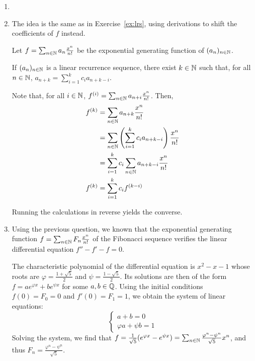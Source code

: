 \begin{solution}
    \begin{enumerate}
        \item[]
        \item The idea is the same as in Exercise~\ref{ex:lrs}, using
            derivations to shift the coefficients of $f$ instead.

            Let $f = \sum_{n \in \mathbb N} a_n \frac{x^n}{n!}$ be the
            exponential generating function of $(a_n)_{n \in \mathbb N}$.

            If $(a_n)_{n \in \mathbb N}$ is a linear recurrence sequence,
            there exist $k \in \mathbb N$ such that, for all $n \in \mathbb N$,
            $a_{n+k} = \sum_{i=1}^k c_i a_{n+k-i}$.

            Note that, for all $i \in \mathbb N$, $f^{(i)} = \sum_{n \in \mathbb N}
            a_{n+i} \frac{x^n}{n!}$.
            Then,
            \begin{align*}
                f^{(k)} &= \sum_{n \in \mathbb N} a_{n+k} \frac{x^n}{n!} \\
                &= \sum_{n \in \mathbb N} \left(\sum_{i=1}^k c_i
                a_{n+k-i}\right) \frac{x^n}{n!} \\
                &= \sum_{i=1}^k c_i \sum_{n \in \mathbb N} a_{n+k-i} \frac{x^n}{n!} \\
                f^{(k)} &= \sum_{i=1}^k c_i f^{(k-i)}
            \end{align*}

            Running the calculations in reverse yields the converse.
        \item Using the previous question, we known that the
            exponential generating function $f = \sum_{n \in \mathbb N} F_n
            \frac{x^n}{n!}$ of the Fibonacci sequence verifies the
            linear differential equation $f''- f'-f = 0$.

            The characteristic polynomial of the differential
            equation is $x^2-x-1$ whose roots are $\varphi =
            \frac{1+\sqrt{5}}{2}$ and $\psi = \frac{1-\sqrt{5}}{2}$.
            Its solutions are then of the form $f = a e^{\varphi x} +
            b e^{\psi x}$ for some $a,b \in \mathbb Q$.
            Using the initial conditions $f(0) = F_0 = 0$ and $f'(0)
            = F_1 = 1$, we obtain the system of linear equations:
            \[
                \begin{cases}
                    a+b = 0 \\
                    \varphi a + \psi b = 1
                \end{cases}
            \]
            Solving the system, we find that $f =
            \frac{1}{\sqrt{5}}(e^{\varphi x} - e^{\psi x})
            = \sum_{n \in \mathbb N} \frac{\varphi^n - \psi^n}{\sqrt{5}} x^n$, and thus
            $F_n = \frac{\varphi^n - \psi^n}{\sqrt{5}}$.
    \end{enumerate}
\end{solution}

